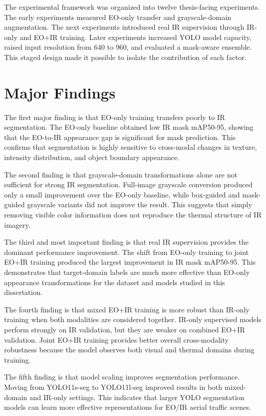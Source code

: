 The experimental framework was organized into twelve thesis-facing experiments. The early experiments measured EO-only transfer and grayscale-domain augmentation. The next experiments introduced real IR supervision through IR-only and EO+IR training. Later experiments increased YOLO model capacity, raised input resolution from 640 to 960, and evaluated a mask-aware ensemble. This staged design made it possible to isolate the contribution of each factor.

\section{Major Findings}

The first major finding is that EO-only training transfers poorly to IR segmentation. The EO-only baseline obtained low IR mask mAP50-95, showing that the EO-to-IR appearance gap is significant for mask prediction. This confirms that segmentation is highly sensitive to cross-modal changes in texture, intensity distribution, and object boundary appearance.

The second finding is that grayscale-domain transformations alone are not sufficient for strong IR segmentation. Full-image grayscale conversion produced only a small improvement over the EO-only baseline, while box-guided and mask-guided grayscale variants did not improve the result. This suggests that simply removing visible color information does not reproduce the thermal structure of IR imagery.

The third and most important finding is that real IR supervision provides the dominant performance improvement. The shift from EO-only training to joint EO+IR training produced the largest improvement in IR mask mAP50-95. This demonstrates that target-domain labels are much more effective than EO-only appearance transformations for the dataset and models studied in this dissertation.

The fourth finding is that mixed EO+IR training is more robust than IR-only training when both modalities are considered together. IR-only supervised models perform strongly on IR validation, but they are weaker on combined EO+IR validation. Joint EO+IR training provides better overall cross-modality robustness because the model observes both visual and thermal domains during training.

The fifth finding is that model scaling improves segmentation performance. Moving from YOLO11s-seg to YOLO11l-seg improved results in both mixed-domain and IR-only settings. This indicates that larger YOLO segmentation models can learn more effective representations for EO/IR aerial traffic scenes.

